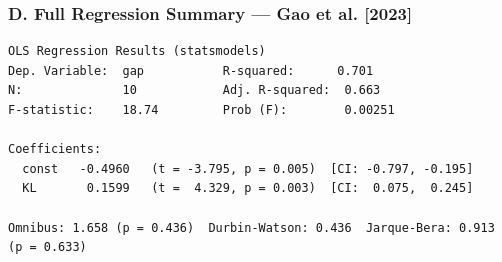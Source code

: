 \subsubsection{D. Full Regression Summary --- Gao et al. [2023]}

\begin{verbatim}
OLS Regression Results (statsmodels)
Dep. Variable:  gap           R-squared:      0.701
N:              10            Adj. R-squared:  0.663
F-statistic:    18.74         Prob (F):        0.00251

Coefficients:
  const   -0.4960   (t = -3.795, p = 0.005)  [CI: -0.797, -0.195]
  KL       0.1599   (t =  4.329, p = 0.003)  [CI:  0.075,  0.245]

Omnibus: 1.658 (p = 0.436)  Durbin-Watson: 0.436  Jarque-Bera: 0.913 (p = 0.633)
\end{verbatim}
